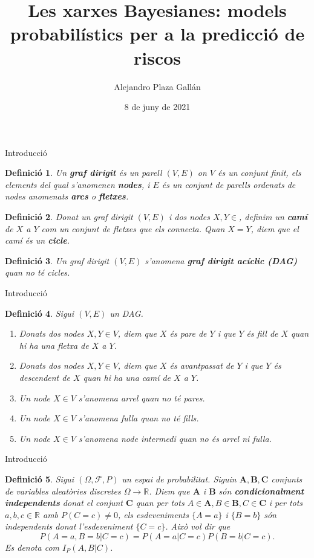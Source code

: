 \documentclass{beamer}
\title[Xarxes bayesianes]{Les xarxes Bayesianes: models probabil\'{i}stics per a la predicci\'{o} de riscos}
\author{Alejandro Plaza Gall\'{a}n}
\date{8 de juny de 2021}
\newtheorem{definicio}{Definici\'{o}}
\theoremstyle{definition}
\begin{document}
\begin{frame}
\titlepage
\end{frame}

\begin{frame}{Introducci\'{o}}
\begin{definicio}
Un \textbf{graf dirigit} \'{e}s un parell $(V,E)$ on $V$ \'{e}s un conjunt finit, els elements del qual s'anomenen \textbf{nodes}, i $E$ \'{e}s un conjunt de parells ordenats de nodes anomenats \textbf{arcs} o \textbf{fletxes}.
\end{definicio}
\pause

\begin{definicio}
Donat un graf dirigit $(V,E)$ i dos nodes $X,Y\in$, definim un \textbf{cam\'{i}} de $X$ a $Y$ com un conjunt de fletxes que els connecta. Quan $X=Y$, diem que el cam\'{i} \'{e}s un \textbf{cicle}.
\end{definicio}
\pause

\begin{definicio}
Un graf dirigit $(V,E)$ s'anomena \textbf{graf dirigit ac\'{i}clic (DAG)} quan no t\'{e} cicles.
\end{definicio}
\end{frame}

\begin{frame}{Introducci\'{o}}
\begin{definicio}
Sigui $(V,E)$ un DAG.
\begin{enumerate}
\item Donats dos nodes $X,Y\in V$, diem que $X$ \'{e}s pare de $Y$ i que $Y$ \'{e}s fill de $X$ quan hi ha una fletxa de $X$ a $Y$.
\pause
\item Donats dos nodes $X,Y\in V$, diem que $X$ \'{e}s avantpassat de $Y$ i que $Y$ \'{e}s descendent de $X$ quan hi ha una cam\'{i} de $X$ a $Y$.
\pause
\item Un node $X\in V$ s'anomena arrel quan no t\'{e} pares.
\pause
\item Un node $X\in V$ s'anomena fulla quan no t\'{e} fills.
\pause
\item Un node $X\in V$ s'anomena node intermedi quan no \'{e}s arrel ni fulla.
\end{enumerate}
\end{definicio}
\end{frame}

\begin{frame}{Introducci\'{o}}
\begin{definicio}
Sigui $(\Omega,\mathcal{F},P)$ un espai de probabilitat. Siguin $\boldsymbol{A},\boldsymbol{B},\boldsymbol{C}$ conjunts de variables aleat\`{o}ries discretes $\Omega\rightarrow\mathbb{R}$. Diem que $\boldsymbol{A}$ i $\boldsymbol{B}$ s\'{o}n \textbf{condicionalment independents} donat el conjunt $\boldsymbol{C}$ quan per tots $A\in\boldsymbol{A},B\in\boldsymbol{B},C\in\boldsymbol{C}$ i per tots $a,b,c\in\mathbb{R}$ amb $P(C=c)\neq0$, els esdeveniments $\{A=a\}$ i $\{B=b\}$ s\'{o}n independents donat l'esdeveniment $\{C=c\}$. \pause Aix\`{o} vol dir que
\[P(A=a,B=b|C=c)=P(A=a|C=c)P(B=b|C=c).\]
Es denota com $I_P(A,B|C)$.
\end{definicio}
\end{frame}
\end{document}
